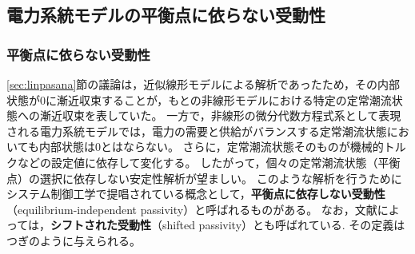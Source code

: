 \documentclass[tombow,dvipdfmx]{corona-a5-1.1}
\begin{document}
\subsection{電力系統モデルの平衡点に依らない受動性\advanced}

\subsubsection{平衡点に依らない受動性}

\ref{sec:linpasana}節の議論は，近似線形モデルによる解析であったため，その内部状態が0に漸近収束することが，もとの非線形モデルにおける特定の定常潮流状態への漸近収束を表していた。
一方で，非線形の微分代数方程式系として表現される電力系統モデルでは，電力の需要と供給がバランスする定常潮流状態においても内部状態は0とはならない。
さらに，定常潮流状態そのものが機械的トルクなどの設定値に依存して変化する。
したがって，個々の定常潮流状態（平衡点）の選択に依存しない安定性解析が望ましい。
このような解析を行うためにシステム制御工学で提唱されている概念として，\textbf{平衡点に依存しない受動性}（equilibrium-independent passivity）と呼ばれるものがある\cite{hines2011equilibrium,simpson2019equilibrium}。
なお，文献によっては，\textbf{シフトされた受動性}（shifted passivity）とも呼ばれている\cite{monshizadeh2019conditions}.
その定義はつぎのように与えられる。
\end{document}
